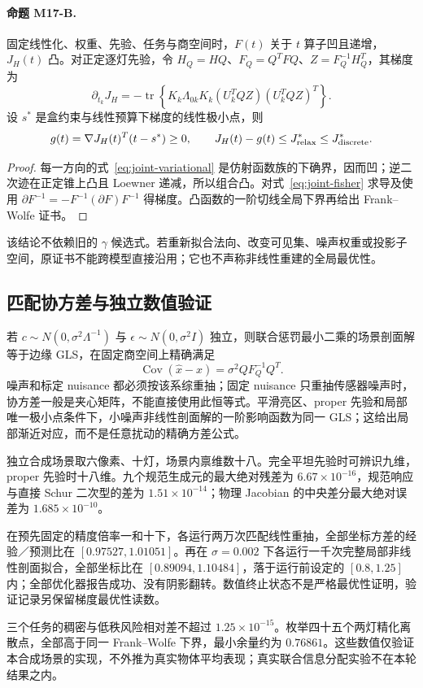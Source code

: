 \paragraph{命题 M17-B.}
固定线性化、权重、先验、任务与商空间时，$F(t)$ 关于 $t$ 算子凹且递增，$J_H(t)$ 凸。对正定逐灯先验，令 $H_Q=HQ$、$F_Q=Q^TFQ$、$Z=F_Q^{-1}H_Q^T$，其梯度为
\begin{equation}
 \partial_{t_k}J_H=-\operatorname{tr}\left\{
 K_k\Lambda_{0k}K_k(U_k^TQZ)(U_k^TQZ)^T\right\}.
\end{equation}
设 $s^*$ 是盒约束与线性预算下梯度的线性极小点，则
\begin{equation}
 g(t)=\nabla J_H(t)^T(t-s^*)\ge0,\qquad
 J_H(t)-g(t)\le J^*_{\rm relax}\le J^*_{\rm discrete}.
\end{equation}
\begin{proof}
每一方向的式~\eqref{eq:joint-variational} 是仿射函数族的下确界，因而凹；逆二次迹在正定锥上凸且 Loewner 递减，所以组合凸。对式~\eqref{eq:joint-fisher} 求导及使用 $\partial F^{-1}=-F^{-1}(\partial F)F^{-1}$ 得梯度。凸函数的一阶切线全局下界再给出 Frank--Wolfe 证书。
\end{proof}
该结论不依赖旧的 $\gamma$ 候选式。若重新拟合法向、改变可见集、噪声权重或投影子空间，原证书不能跨模型直接沿用；它也不声称非线性重建的全局最优性。

\subsection{匹配协方差与独立数值验证}

若 $c\sim N(0,\sigma^2\Lambda^{-1})$ 与 $\epsilon\sim N(0,\sigma^2I)$ 独立，则联合惩罚最小二乘的场景剖面解等于边缘 GLS，在固定商空间上精确满足
\begin{equation}
 \operatorname{Cov}(\hat x-x)=\sigma^2QF_Q^{-1}Q^T.
\end{equation}
噪声和标定 nuisance 都必须按该系综重抽；固定 nuisance 只重抽传感器噪声时，协方差一般是夹心矩阵，不能直接使用此恒等式。平滑亮区、proper 先验和局部唯一极小点条件下，小噪声非线性剖面解的一阶影响函数为同一 GLS；这给出局部渐近对应，而不是任意扰动的精确方差公式。

独立合成场景取六像素、十灯，场景内禀维数十八。完全平坦先验时可辨识九维，proper 先验时十八维。九个规范生成元的最大绝对残差为 $6.67\times10^{-16}$，规范响应与直接 Schur 二次型的差为 $1.51\times10^{-14}$；物理 Jacobian 的中央差分最大绝对误差为 $1.685\times10^{-10}$。

在预先固定的精度倍率一和十下，各运行两万次匹配线性重抽，全部坐标方差的经验／预测比在 $[0.97527,1.01051]$。再在 $\sigma=0.002$ 下各运行一千次完整局部非线性剖面拟合，全部坐标比在 $[0.89094,1.10484]$，落于运行前设定的 $[0.8,1.25]$ 内；全部优化器报告成功、没有阴影翻转。数值终止状态不是严格最优性证明，验证记录另保留梯度最优性读数。

三个任务的稠密与低秩风险相对差不超过 $1.25\times10^{-15}$。枚举四十五个两灯精化离散点，全部高于同一 Frank--Wolfe 下界，最小余量约为 $0.76861$。这些数值仅验证本合成场景的实现，不外推为真实物体平均表现；真实联合信息分配实验不在本轮结果之内。
